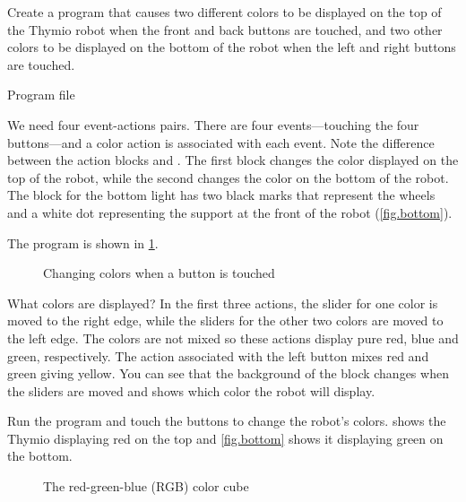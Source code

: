 
\label{ch.colors}


Create a program that causes two different colors to be displayed on the
top of the Thymio robot when the front and back buttons are touched, and
two other colors to be displayed on the bottom of the robot when the
left and right buttons are touched.

{\raggedleft \hfill Program file }

We need four event-actions pairs. There are four events---touching the
four buttons---and a color action is associated with each event. Note
the difference between the action blocks  and
. The first block changes the color displayed
on the top of the robot, while the second changes the color on the
bottom of the robot. The block for the bottom light has two black marks
that represent the wheels and a white dot representing the support at
the front of the robot (\cref{fig.bottom}).

The program is shown in \cref{fig.colors}.

\begin{figure}
\caption{Changing colors when a button is touched}\label{fig.colors}
\end{figure}

What colors are displayed? In the first three actions, the slider for
one color is moved to the right edge, while the sliders for the other
two colors are moved to the left edge. The colors are not mixed so these
actions display pure red, blue and green, respectively. The action
associated with the left button mixes red and green giving yellow. You
can see that the background of the block changes when the
sliders are moved and shows which color the robot will display.

Run the program  and touch the buttons to change the
robot's colors.  shows the Thymio displaying red on the
top and \cref{fig.bottom} shows it displaying green on the bottom.



\begin{figure}
\caption{The red-green-blue (RGB) color cube}\label{fig.cube}
\end{figure}


